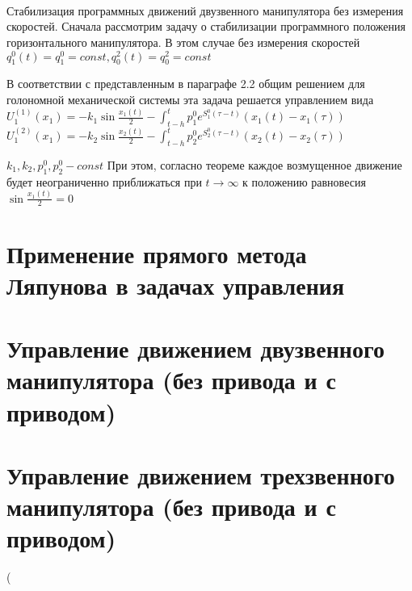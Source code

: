 \documentclass[14pt,a4paper,final,russian]{report}
\numberwithin{theorem}{chapter}
\numberwithin{lemma}{chapter}
\numberwithin{consectary}{chapter}
\numberwithin{pointout}{chapter}
\numberwithin{definition}{chapter}
\begin{document}
	\vglue 0.5cm
	
	\dotfill\mbox{\ \ \pageref{postfix}} \vglue 0.5cm
	
	 \dotfill\mbox{\ \ \pageref{bibl}}
	\par \vglue 0.5cm
	 \dotfill\mbox{\ \ \pageref{app1start}}
	
	\newpage
	
	\fontsize{14pt}{21pt}\selectfont
	
	
	
Стабилизация программных движений двузвенного манипулятора без измерения скоростей. Сначала рассмотрим задачу о стабилизации программного положения горизонтального манипулятора. В этом случае без измерения скоростей $q^0_1 (t) = q^0_1 = const, q^2_0 (t) = q^2_0 = const$

В соответствии с представленным в параграфе 2.2 общим решением для голономной механической системы эта задача решается управлением вида $U^{(1)}_1 (x_1) = - k_1 \sin \frac{x_1(t)}{2} - \int_{t-h}^t p_1^0 e^{S_1^0 (\tau - t)} (x_1 (t) - x_1 (\tau))$ $U^{(2)}_1 (x_1) = - k_2 \sin \frac{x_2(t)}{2} - \int_{t-h}^t p_2^0 e^{S_2^0 (\tau - t)} (x_2 (t) - x_2 (\tau))$

$k_1, k_2, p_1^0, p_2^0 - const$
При этом, согласно теореме каждое возмущенное движение будет неограниченно приближаться при $t \to \infty$ к положению равновесия $\sin \frac{x_1(t)}{2} = 0 $	\chapter{Применение прямого метода Ляпунова в задачах управления}
	
	
	 
	 
	 
	
	\chapter{Управление движением двузвенного манипулятора (без привода и с приводом)}
	
	
	 
	
	\chapter{Управление движением трехзвенного манипулятора (без привода и с приводом)}
	
	
	 
	
	
	
	
	
\left( 	
\end{document}

